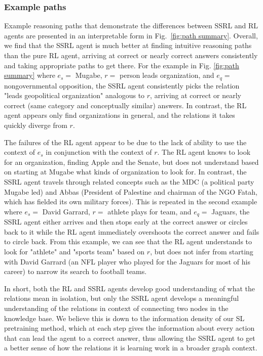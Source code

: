 \documentclass[lettersize,journal]{IEEEtran}
\begin{document}
\subsubsection{Example paths}
Example reasoning paths that demonstrate the differences between SSRL and RL agents are presented in an interpretable form in Fig.~\ref{fig:path summary}. Overall, we find that the SSRL agent is much better at finding intuitive reasoning paths than the pure RL agent, arriving at correct or nearly correct answers consistently and taking appropriate paths to get there. 
For the example in Fig. \ref{fig:path summary} where $e_s =$ Mugabe, $r = $ person leads organization, and $e_q =$ nongovernmental opposition, the SSRL agent consistently picks the relation "leads geopolitical organization" analogous to $r$, arriving at correct or nearly correct (same category and conceptually similar) answers. In contrast, the RL agent appears only find organizations in general, and the relations it takes quickly diverge from $r$. 

The failures of the RL agent appear to be due to the lack of ability to use the context of $e_s$ in conjunction with the context of $r$. The RL agent knows to look for an organization, finding Apple and the Senate, but does not understand based on starting at Mugabe what kinds of organization to look for. In contrast, the SSRL agent travels through related concepts such as the MDC (a political party Mugabe led) and Abbas (President of Palestine and chairman of the NGO Fatah, which has fielded its own military forces). This is repeated in the second example where $e_s =$ David Garrard, $r = $ athlete plays for team, and $e_q =$ Jaguars, the SSRL agent either arrives and then stops early at the correct answer or circles back to it while the RL agent immediately overshoots the correct answer and fails to circle back. From this example, we can see that the RL agent understands to look for "athlete" and "sports team" based on $r$, but does not infer from starting with David Garrard (an NFL player who played for the Jaguars for most of his career) to narrow its search to football teams.

In short, both the RL and SSRL agents develop good understanding of what the relations mean in isolation, but only the SSRL agent develops a meaningful understanding of the relations in context of connecting two nodes in the knowledge base. We believe this is down to the information density of our SL pretraining method, which at each step gives the information about every action that can lead the agent to a correct answer, thus allowing the SSRL agent to get a better sense of how the relations it is learning work in a broader graph context.
\end{document}
